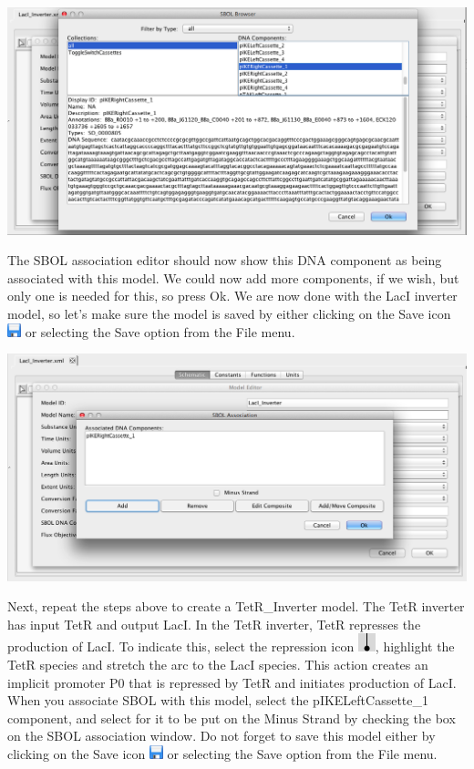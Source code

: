 \documentclass[titlepage,11pt]{article}
\begin{document}
\begin{center}
\includegraphics[width=160mm]{screenshots/SBOLBrowserGT}
\end{center}

The SBOL association editor should now show this DNA component as being associated with this model.  We could now add more components, if we wish, but only one is needed for this, so press Ok.  We are now done with the LacI inverter model, so let's make sure the model is saved by either clicking on the Save icon \includegraphics{../gui/icons/save} or selecting the Save option from the File menu.

\begin{center}
\includegraphics[width=160mm]{screenshots/SBOLAssociationGT}
\end{center}

Next, repeat the steps above to create a TetR\_Inverter model.  The TetR inverter has input TetR and output LacI.  In the TetR inverter, TetR represses the production of LacI.  To indicate this, select the repression icon \includegraphics{../gui/icons/modelview/inhibition_selected}, highlight the TetR species and stretch the arc to the LacI species.  This action creates an implicit promoter P0 that is repressed by TetR and initiates production of LacI.  When you associate SBOL with this model, select the pIKELeftCassette\_1 component, and select for it to be put on the Minus Strand by checking the box on the SBOL association window.  Do not forget to save this model either by clicking on the Save icon \includegraphics{../gui/icons/save} or selecting the Save option from the File menu.
\end{document}
